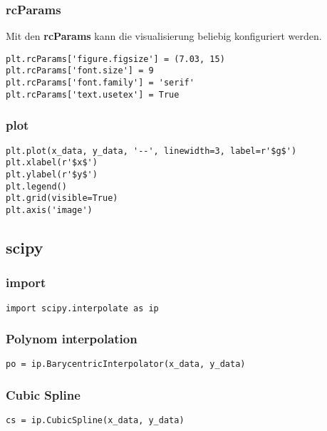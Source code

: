 \subsubsection{rcParams}

Mit den \textbf{rcParams} kann die visualisierung beliebig konfiguriert werden.

\begin{verbatim}
plt.rcParams['figure.figsize'] = (7.03, 15)
plt.rcParams['font.size'] = 9
plt.rcParams['font.family'] = 'serif'
plt.rcParams['text.usetex'] = True
\end{verbatim}

\subsubsection{plot}

\begin{verbatim}
plt.plot(x_data, y_data, '--', linewidth=3, label=r'$g$')
plt.xlabel(r'$x$')
plt.ylabel(r'$y$')
plt.legend()
plt.grid(visible=True)
plt.axis('image')
\end{verbatim}

\subsection{scipy}

\subsubsection{import}

\begin{verbatim}
import scipy.interpolate as ip
\end{verbatim}

\subsubsection{Polynom interpolation}

\begin{verbatim}
po = ip.BarycentricInterpolator(x_data, y_data)
\end{verbatim}

\subsubsection{Cubic Spline}

\begin{verbatim}
cs = ip.CubicSpline(x_data, y_data)
\end{verbatim}
